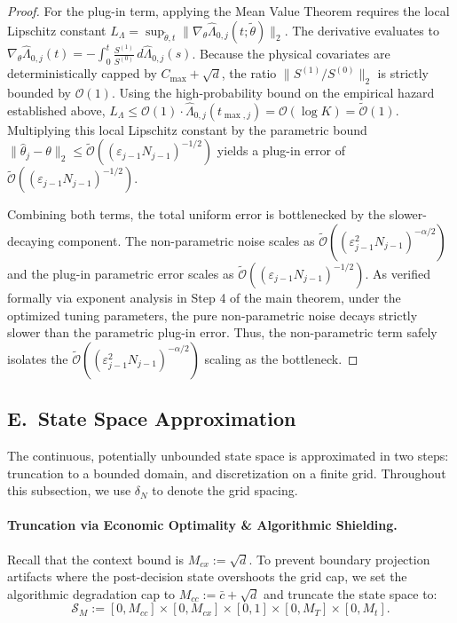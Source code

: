 \documentclass[letterpaper, 10 pt, conference]{IEEEconf}
\newcommand{\what}[1]{\widehat{#1}}
\begin{document}
\begin{proof}
    For the plug-in term, applying the Mean Value Theorem requires the local Lipschitz constant $L_\Lambda = \sup_{\tilde{\theta}, t} \|\nabla_\theta \what{\Lambda}_{0,j}(t;\tilde{\theta})\|_2$. The derivative evaluates to $\nabla_\theta \what{\Lambda}_{0,j}(t) = - \int_0^t \frac{S^{(1)}}{S^{(0)}} \, d\what{\Lambda}_{0,j}(s)$. Because the physical covariates are deterministically capped by $C_{\max} + \sqrt{d}$, the ratio $\|S^{(1)} / S^{(0)}\|_2$ is strictly bounded by $\mathcal{O}(1)$. Using the high-probability bound on the empirical hazard established above, $L_\Lambda \le \mathcal{O}(1) \cdot \what{\Lambda}_{0,j}(t_{\max,j}) = \mathcal{O}(\log K) = \widetilde{\mathcal{O}}(1)$. Multiplying this local Lipschitz constant by the parametric bound $\|\what{\theta}_j - \theta\|_2 \le \widetilde{\mathcal{O}}((\varepsilon_{j-1} N_{j-1})^{-1/2})$ yields a plug-in error of $\widetilde{\mathcal{O}}((\varepsilon_{j-1} N_{j-1})^{-1/2})$.

    Combining both terms, the total uniform error is bottlenecked by the slower-decaying component. The non-parametric noise scales as $\widetilde{\mathcal{O}}((\varepsilon_{j-1}^2 N_{j-1})^{-\alpha/2})$ and the plug-in parametric error scales as $\widetilde{\mathcal{O}}((\varepsilon_{j-1} N_{j-1})^{-1/2})$. As verified formally via exponent analysis in Step 4 of the main theorem, under the optimized tuning parameters, the pure non-parametric noise decays strictly slower than the parametric plug-in error. Thus, the non-parametric term safely isolates the $\widetilde{\mathcal{O}}((\varepsilon_{j-1}^2 N_{j-1})^{-\alpha/2})$ scaling as the bottleneck.
\end{proof}


\subsection*{E.~State Space Approximation}
\label{sec:app_approx}

The continuous, potentially unbounded state space is approximated in two steps: truncation to a bounded domain, and discretization on a finite grid. Throughout this subsection, we use $\delta_N$ to denote the grid spacing.

\paragraph{Truncation via Economic Optimality \& Algorithmic Shielding.}
Recall that the context bound is $M_{cx} := \sqrt{d}$. To prevent boundary projection artifacts where the post-decision state overshoots the grid cap, we set the algorithmic degradation cap to $M_{cc} := \bar{c} + \sqrt{d}$ and truncate the state space to:
\begin{equation}
    \mathcal{S}_M := [0, M_{cc}] \times [0, M_{cx}] \times [0, 1] \times [0, M_T] \times [0, M_t].
\end{equation}
\end{document}

